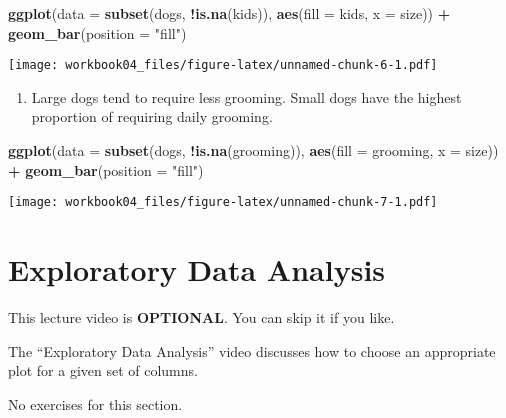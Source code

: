 \documentclass[
]{article}
\newenvironment{Shaded}{\begin{snugshade}}{\end{snugshade}}
\newcommand{\DataTypeTok}[1]{\textcolor[rgb]{0.13,0.29,0.53}{#1}}
\newcommand{\KeywordTok}[1]{\textcolor[rgb]{0.13,0.29,0.53}{\textbf{#1}}}
\newcommand{\NormalTok}[1]{#1}
\newcommand{\OperatorTok}[1]{\textcolor[rgb]{0.81,0.36,0.00}{\textbf{#1}}}
\newcommand{\StringTok}[1]{\textcolor[rgb]{0.31,0.60,0.02}{#1}}
\providecommand{\tightlist}{%
  \setlength{\itemsep}{0pt}\setlength{\parskip}{0pt}}
\begin{document}
\begin{Shaded}
\begin{Highlighting}[]
\KeywordTok{ggplot}\NormalTok{(}\DataTypeTok{data =} \KeywordTok{subset}\NormalTok{(dogs, }\OperatorTok{!}\KeywordTok{is.na}\NormalTok{(kids)), }\KeywordTok{aes}\NormalTok{(}\DataTypeTok{fill =}\NormalTok{ kids, }\DataTypeTok{x =}\NormalTok{ size)) }\OperatorTok{+}
\StringTok{   }\KeywordTok{geom\_bar}\NormalTok{(}\DataTypeTok{position =} \StringTok{"fill"}\NormalTok{)}
\end{Highlighting}
\end{Shaded}

\texttt{[image: workbook04\_files/figure-latex/unnamed-chunk-6-1.pdf]}

\begin{enumerate}
\def\labelenumi{\arabic{enumi}.}
\setcounter{enumi}{2}
\tightlist
\item
  Large dogs tend to require less grooming. Small dogs have the highest
  proportion of requiring daily grooming.
\end{enumerate}

\begin{Shaded}
\begin{Highlighting}[]
\KeywordTok{ggplot}\NormalTok{(}\DataTypeTok{data =} \KeywordTok{subset}\NormalTok{(dogs, }\OperatorTok{!}\KeywordTok{is.na}\NormalTok{(grooming)), }\KeywordTok{aes}\NormalTok{(}\DataTypeTok{fill =}\NormalTok{ grooming, }\DataTypeTok{x =}\NormalTok{ size)) }\OperatorTok{+}
\StringTok{   }\KeywordTok{geom\_bar}\NormalTok{(}\DataTypeTok{position =} \StringTok{"fill"}\NormalTok{)}
\end{Highlighting}
\end{Shaded}

\texttt{[image: workbook04\_files/figure-latex/unnamed-chunk-7-1.pdf]}

\hypertarget{exploratory-data-analysis}{%
\section{Exploratory Data Analysis}\label{exploratory-data-analysis}}

This lecture video is \textbf{OPTIONAL}. You can skip it if you like.

The ``Exploratory Data Analysis'' video discusses how to choose an
appropriate plot for a given set of columns.

No exercises for this section.
\end{document}
